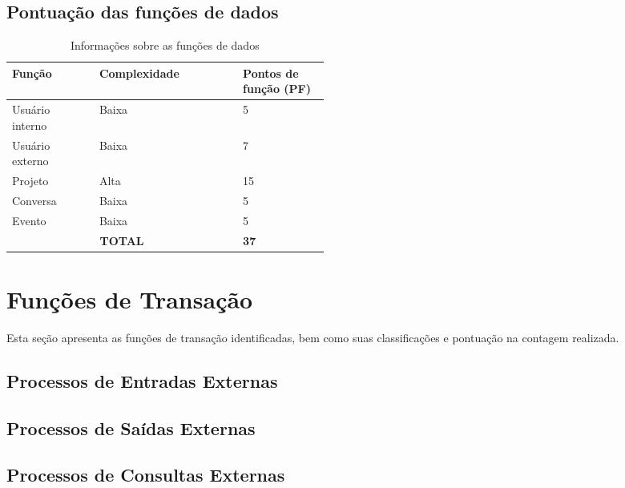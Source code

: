   \subsection{Pontuação das funções de dados}
  
      \begin{table}[!h]
      \centering
      \caption{Informações sobre as funções de dados}
      \label{funcoes_dados}
	\begin{tabular}{|p{0.12\linewidth}|p{0.20\linewidth}|p{0.14\linewidth}|}
	\hline
	\textbf{Função} & \textbf{Complexidade} & \textbf{Pontos de função (PF)} \\
	\hline
	Usuário interno & Baixa & 5 \\
	\hline
	Usuário externo & Baixa & 7 \\
	\hline
	Projeto & Alta & 15 \\
	\hline
	Conversa & Baixa & 5 \\
	\hline
	Evento & Baixa & 5 \\
	\hline
	\multicolumn{2}{|c|}{\textbf{TOTAL}} & \textbf{37} \\ \cline{3-3}
	\hline
	\end{tabular}
      \end{table}

\vfill
\pagebreak
\section{Funções de Transação}
  
 Esta seção apresenta as funções de transação identificadas, bem como suas classificações e pontuação na contagem realizada.
  
  \subsection{Processos de Entradas Externas}
  
    
  
  \subsection{Processos de Saídas Externas}
    
    

  \subsection{Processos de Consultas Externas}
    
